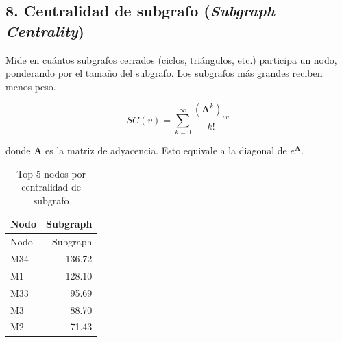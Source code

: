 \documentclass[
  letterpaper,
  DIV=11,
  numbers=noendperiod]{scrreprt}
\newenvironment{Shaded}{\begin{snugshade}}{\end{snugshade}}
\newcommand{\AttributeTok}[1]{\textcolor[rgb]{0.40,0.45,0.13}{#1}}
\newcommand{\CommentTok}[1]{\textcolor[rgb]{0.37,0.37,0.37}{#1}}
\newcommand{\ConstantTok}[1]{\textcolor[rgb]{0.56,0.35,0.01}{#1}}
\newcommand{\DecValTok}[1]{\textcolor[rgb]{0.68,0.00,0.00}{#1}}
\newcommand{\FunctionTok}[1]{\textcolor[rgb]{0.28,0.35,0.67}{#1}}
\newcommand{\NormalTok}[1]{\textcolor[rgb]{0.00,0.23,0.31}{#1}}
\newcommand{\OtherTok}[1]{\textcolor[rgb]{0.00,0.23,0.31}{#1}}
\newcommand{\SpecialCharTok}[1]{\textcolor[rgb]{0.37,0.37,0.37}{#1}}
\newcommand{\StringTok}[1]{\textcolor[rgb]{0.13,0.47,0.30}{#1}}
\begin{document}
\subsection{\texorpdfstring{8. Centralidad de subgrafo (\emph{Subgraph
Centrality})}{8. Centralidad de subgrafo (Subgraph Centrality)}}\label{centralidad-de-subgrafo-subgraph-centrality}

Mide en cuántos subgrafos cerrados (ciclos, triángulos, etc.) participa
un nodo, ponderando por el tamaño del subgrafo. Los subgrafos más
grandes reciben menos peso.

\[
SC(v) = \sum_{k=0}^{\infty} \frac{(\mathbf{A}^k)_{vv}}{k!}
\]

donde \(\mathbf{A}\) es la matriz de adyacencia. Esto equivale a la
diagonal de \(e^{\mathbf{A}}\).

\begin{Shaded}
\end{Shaded}

\begin{longtable}[]{@{}lr@{}}
\caption{Top 5 nodos por centralidad de subgrafo}\tabularnewline
\toprule\noalign{}
Nodo & Subgraph \\
\midrule\noalign{}
\endfirsthead
\toprule\noalign{}
Nodo & Subgraph \\
\midrule\noalign{}
\endhead
\bottomrule\noalign{}
\endlastfoot
M34 & 136.72 \\
M1 & 128.10 \\
M33 & 95.69 \\
M3 & 88.70 \\
M2 & 71.43 \\
\end{longtable}
\end{document}

